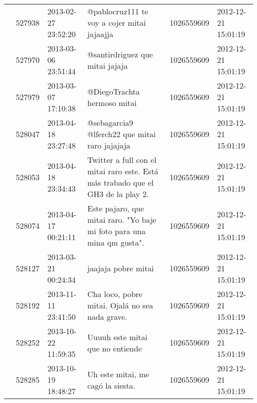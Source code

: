 \begin{tabular}{llllrl}
           & 527938  & 2013-02-27 23:52:20 &                                                                                                  @pablocruz111 te voy a cojer mitai jajaajja &  1026559609 & 2012-12-21 15:01:19 \\
           & 527970  & 2013-03-06 23:51:44 &                                                                                                              @santirdriguez que mitai jajaja &  1026559609 & 2012-12-21 15:01:19 \\
           & 527979  & 2013-03-07 17:10:38 &                                                                                                                  @DiegoTrachta hermoso mitai &  1026559609 & 2012-12-21 15:01:19 \\
           & 528047  & 2013-04-18 23:27:48 &                                                                                               @sebagarcia9 @lferch22 que mitai raro jajajaja &  1026559609 & 2012-12-21 15:01:19 \\
           & 528053  & 2013-04-18 23:34:43 &                                                             Twitter a full con el mitai raro este. Está más trabado que el GH3 de la play 2. &  1026559609 & 2012-12-21 15:01:19 \\
           & 528074  & 2013-04-17 00:21:11 &                                                                       Este pajaro, que mitai raro. "Yo baje mi foto para una mina qm gusta". &  1026559609 & 2012-12-21 15:01:19 \\
           & 528127  & 2013-03-21 00:24:34 &                                                                                                                          jaajaja pobre mitai &  1026559609 & 2012-12-21 15:01:19 \\
           & 528192  & 2013-11-11 23:41:50 &                                                                                              Cha loco, pobre mitai. Ojalá no sea nada grave. &  1026559609 & 2012-12-21 15:01:19 \\
           & 528252  & 2013-10-22 11:59:35 &                                                                                                             Uuuuh este mitai que no entiende &  1026559609 & 2012-12-21 15:01:19 \\
           & 528285  & 2013-10-19 18:48:27 &                                                                                                            Uh este mitai, me cagó la siesta. &  1026559609 & 2012-12-21 15:01:19 \\

\end{tabular}
